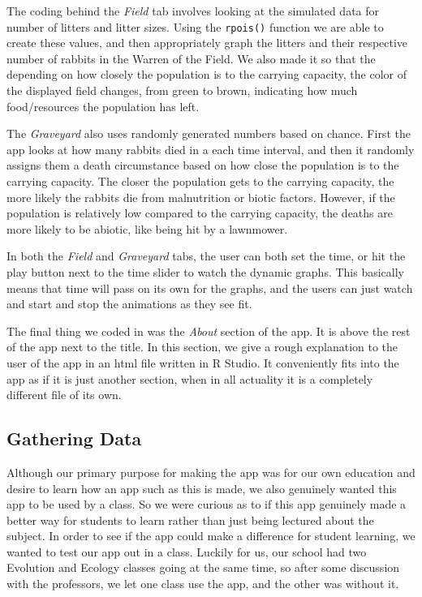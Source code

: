\documentclass[titlepage]{article}\usepackage[]{graphicx}\usepackage[]{color}
\begin{document}
The coding behind the \textit{Field} tab involves looking at the simulated data for number of litters and litter sizes. Using the \texttt{rpois()} function we are able to create these values, and then appropriately graph the litters and their respective number of rabbits in the Warren of the Field. We also made it so that the depending on how closely the population is to the carrying capacity, the color of the displayed field changes, from green to brown, indicating how much food/resources the population has left. 

The \textit{Graveyard} also uses randomly generated numbers based on chance. First the app looks at how many rabbits died in a each time interval, and then it randomly assigns them a death circumstance based on how close the population is to the carrying capacity. The closer the population gets to the carrying capacity, the more likely the rabbits die from malnutrition or biotic factors. However, if the population is relatively low compared to the carrying capacity, the deaths are more likely to be abiotic, like being hit by a lawnmower. 

In both the \textit{Field} and \textit{Graveyard} tabs, the user can both set the time, or hit the play button next to the time slider to watch the dynamic graphs. This basically means that time will pass on its own for the graphs, and the users can just watch and start and stop the animations as they see fit. 

The final thing we coded in was the \textit{About} section of the app. It is above the rest of the app next to the title. In this section, we give a rough explanation to the user of the app in an html file written in R Studio. It conveniently fits into the app as if it is just another section, when in all actuality it is a completely different file of its own. 









\subsection{Gathering Data}

Although our primary purpose for making the app was for our own education and desire to learn how an app such as this is made, we also genuinely wanted this app to be used by a class. So we were curious as to if this app genuinely made a better way for students to learn rather than just being lectured about the subject. In order to see if the app could make a difference for student learning, we wanted to test our app out in a class. Luckily for us, our school had two Evolution and Ecology classes going at the same time, so after some discussion with the professors, we let one class use the app, and the other was without it. 
\end{document}
